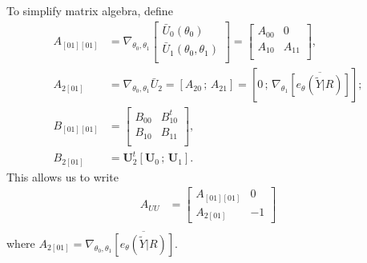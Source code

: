 \documentclass[12pt]{article}
\begin{document}
To simplify matrix algebra, define 
\begin{align*}
A_{[01][01]} &= \nabla_{\theta_{0}, \theta_{1}}   
\left[
            \begin{array}{c}
              \bar{U}_{0}(\theta_{0}) \\
              \bar{U}_{1}(\theta_{0}, \theta_{1}) \\
            \end{array}
\right] = \left[
  \begin{array}{cc}
    A_{00}& 0 \\
    A_{10} & A_{11} \\
  \end{array}
\right],\\
A_{2[01]} &= \nabla_{\theta_{0}, \theta_{1}} \bar{U}_{2}  = \left[
            A_{20} \, ;\, A_{21} \right] = [0 \, ; \, \nabla_{\theta_{1}} \overline{[e_{\theta}(\tilde{Y} | R)]}];\\
B_{[01][01]} &= \left[
               \begin{array}{cc}
                 B_{00}& B_{10}^{t} \\
                 B_{10} & B_{11} \\
               \end{array}
\right] ,\\
B_{2[01]} &= \mathbf{U}_{2}^{t} [ \mathbf{U}_{0} \,;\, \mathbf{U}_{1}
            ] .
\end{align*}
This allows us to write 
\begin{align*}
A_{UU}&= \left[
  \begin{array}{cc}
    A_{[01][01]} & 0 \\ 
      A_{2[01]} & -1
  \end{array}
\right] 
 \\
\end{align*}
where $A_{2[01]} = \nabla_{\theta_{0}, \theta_{1}}
    \overline{[e_{\theta}(\tilde{Y} | R ) ]}$.   
\end{document}
